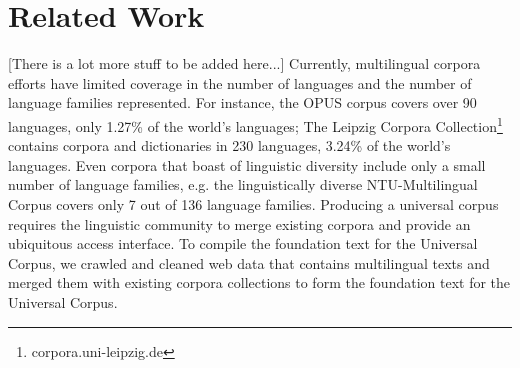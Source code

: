 \section{Related Work} \label{sec:related}

[There is a lot more stuff to be added here...]
Currently, multilingual corpora efforts have limited coverage in the number of languages and the number of language families represented. For instance, the OPUS corpus \cite{tiedemann2012opus} covers over 90 languages, only 1.27\% of the world's languages; The Leipzig Corpora Collection\footnote{corpora.uni-leipzig.de} \cite{biemann2007leipzig} contains corpora and dictionaries in 230 languages, 3.24\% of the world's languages. Even corpora that boast of linguistic diversity include only a small number of language families, e.g. the linguistically diverse NTU-Multilingual Corpus \cite{tan2011ntu} covers only 7 out of 136 language families. Producing a universal corpus requires the linguistic community to merge existing corpora and provide an ubiquitous access interface. To compile the foundation text for the Universal Corpus, we crawled and cleaned web data that contains multilingual texts and merged them with existing corpora collections to form the foundation text for the Universal Corpus.

